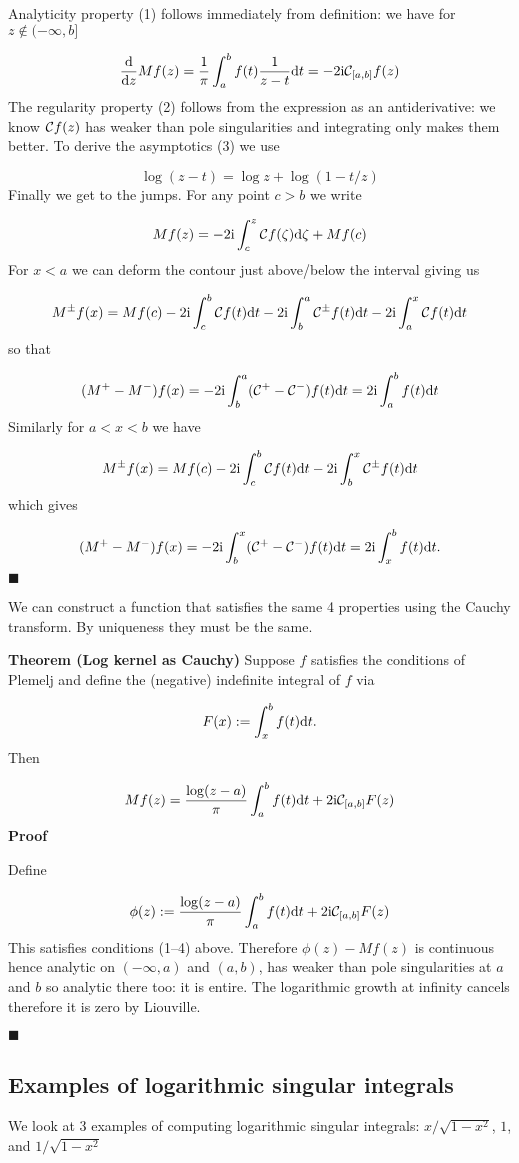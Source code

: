 \documentclass[12pt,a4paper]{article}
\def\D{ {\rm d} }
\def\I{ {\rm i} }
\def\CC{ {\cal C} }
\def\dt{\D t}
\def\endash{–}
\begin{document}
Analyticity property (1) follows immediately from definition: we have for $z \notin (-\infty,b]$

\[
{\D \over \D z} M f(z) = {1 \over \pi} \int_{a}^b f(t) {1\over z -t}  \dt = -2 \I \CC_{[a,b]} f(z)
\]
The regularity property (2) follows from the expression as an antiderivative: we know $\CC f(z)$ has weaker than pole singularities and integrating only makes them better. To derive the asymptotics (3) we use

\[
\log(z - t) = \log z + \log(1 - t/z)
\]
Finally we get to the jumps. For any point $c > b$ we write

\[
M f(z) = -2 \I \int_c^z \CC f(\zeta) \D \zeta + M f(c)
\]
For $x < a$ we can deform the contour just above/below the interval giving us

\[
M^\pm f(x) = Mf(c) -2 \I \int_c^b \CC f(t) \D t -2 \I \int_b^a \CC^\pm f(t) \D t -2 \I \int_a^x \CC f(t) \D t
\]
so that

\[
(M^+ - M^-) f(x) = -2 \I \int_b^a (\CC^+ - \CC^-) f(t) \D t  = 2 \I \int_a^b f(t) \D t
\]
Similarly for $a < x < b$ we have

\[
M^\pm f(x) = Mf(c) -2 \I \int_c^b \CC f(t) \D t -2 \I \int_b^x \CC^\pm f(t) \D t
\]
which gives

\[
(M^+ - M^-) f(x) = -2 \I \int_b^x (\CC^+ - \CC^-) f(t) \D t  = 2 \I \int_x^b f(t) \D t.
\]
\ensuremath{\blacksquare}

We can construct a function that satisfies the same 4 properties using the Cauchy transform. By uniqueness they must be the same.

\textbf{Theorem (Log kernel as Cauchy)} Suppose $f$ satisfies the conditions of Plemelj and define the (negative) indefinite integral of $f$ via

\[
F(x) := \int_x^b f(t) \D t.
\]
Then

\[
M f(z) = {\log(z-a) \over \pi} \int_a^b f(t) \D t + 2 \I \CC_{[a,b]} F(z)
\]
\textbf{Proof}

Define

\[
\phi(z) := {\log(z-a) \over \pi} \int_a^b f(t) \D t + 2 \I \CC_{[a,b]} F(z)
\]
This satisfies conditions (1\ensuremath{\endash}4) above. Therefore $\phi(z) - M f(z)$ is continuous hence analytic on $(-\infty,a)$ and $(a,b)$, has weaker than pole singularities at $a$ and $b$ so analytic there too: it is entire. The logarithmic growth at infinity cancels therefore it is zero by Liouville.

\ensuremath{\blacksquare}

\subsection{Examples of logarithmic singular integrals}
We look at 3 examples of computing logarithmic singular integrals: $x/\sqrt{1-x^2}$, $1$, and $1/\sqrt{1-x^2}$
\end{document}
